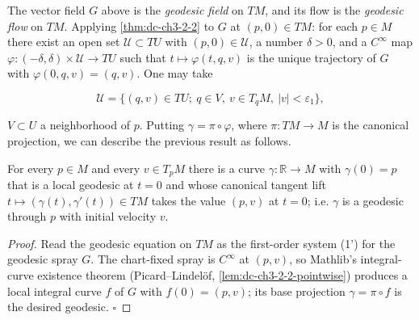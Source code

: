 \begin{definition}
  \label{def:dc-ch3-2-4}
  \leanok
  The vector field $G$ above is the \emph{geodesic field} on $TM$, and its flow is the
  \emph{geodesic flow} on $TM$. Applying \cref{thm:dc-ch3-2-2} to $G$ at $(p,0)\in TM$: for each
  $p\in M$ there exist an open set $\mathcal{U}\subset TU$ with $(p,0)\in\mathcal{U}$,
  a number $\delta>0$, and a $C^\infty$ map $\varphi:(-\delta,\delta)\times\mathcal{U}\to TU$
  such that $t\mapsto\varphi(t,q,v)$ is the unique trajectory of $G$ with
  $\varphi(0,q,v)=(q,v)$. One may take
  
  $$
  \mathcal{U}=\{(q,v)\in TU;\ q\in V,\ v\in T_qM,\ |v|<\varepsilon_1\},
  $$
  
  $V\subset U$ a neighborhood of $p$. Putting $\gamma=\pi\circ\varphi$, where
  $\pi:TM\to M$ is the canonical projection, we can describe the previous result as
  follows.
\end{definition}

\begin{lemma}
  \label{lem:dc-ch3-2-5-exist}
  \leanok
  For every $p\in M$ and every $v\in T_pM$ there is a curve $\gamma:\mathbb{R}\to M$
  with $\gamma(0)=p$ that is a local geodesic at $t=0$ and whose canonical tangent
  lift $t\mapsto(\gamma(t),\gamma'(t))\in TM$ takes the value $(p,v)$ at $t=0$; i.e.
  $\gamma$ is a geodesic through $p$ with initial velocity $v$.
\end{lemma}
\begin{proof}
  \leanok
  Read the geodesic equation on $TM$ as the first-order system (1') for the
  geodesic spray $G$. The chart-fixed spray is $C^\infty$ at $(p,v)$, so Mathlib's
  integral-curve existence theorem (Picard--Lindel\"of,
  \cref{lem:dc-ch3-2-2-pointwise}) produces a local integral curve $f$ of $G$ with
  $f(0)=(p,v)$; its base projection $\gamma=\pi\circ f$ is the desired geodesic. $\square$
\end{proof}

